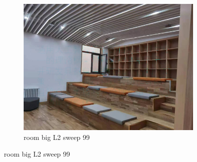 \documentclass[11pt]{article}
\begin{document}
\begin{figure}[ht!]
\begin{subfigure}[]{0.333\linewidth}
        \centering
        \includegraphics[width=\linewidth]{fig/restoration/room_big/L2/gibbs_99.jpg}
        \caption{room big L2 sweep 99}
    \end{subfigure}%
\end{figure}
\end{document}
